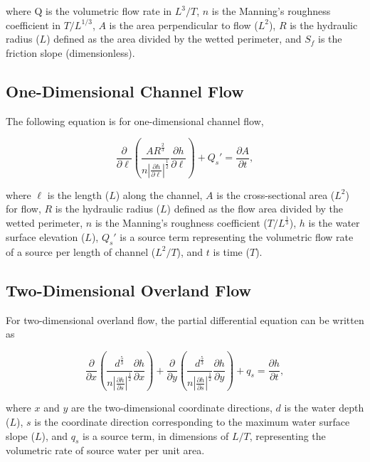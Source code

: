 \documentclass[fleqn]{article}
\begin{document}
\noindent where Q is the volumetric flow rate in $L^3/T$, $n$ is the Manning's roughness coefficient in $T/L^{1/3}$, $A$ is the area perpendicular to flow ($L^2$), $R$ is the hydraulic radius ($L$) defined as the area divided by the wetted perimeter, and $S_f$ is the friction slope (dimensionless).

\subsection{One-Dimensional Channel Flow}

The following equation is for one-dimensional channel flow,

\begin{equation}
  \frac{\partial}{\partial \ell}
  \left (
  \frac{A R^{\frac{2}{3}}}{n \left | \frac{\partial h}{\partial \ell} \right |^{\frac{1}{2}} } \frac{\partial h}{\partial \ell}
  \right )
  + Q_s'
  =   
  \frac{\partial A}{\partial t},
\label{eqn:onedpd}
\end{equation}

\noindent where $\ell$ is the length ($L$) along the channel, $A$ is the cross-sectional area  ($L^2$) for flow, $R$ is the hydraulic radius ($L$) defined as the flow area divided by the wetted perimeter, $n$ is the Manning's roughness coefficient ($T/L^{\frac{1}{3}}$), $h$ is the water surface elevation ($L$), $Q_s'$ is a source term representing the volumetric flow rate of a source per length of channel ($L^2/T$), and $t$ is time ($T$). 

\subsection{Two-Dimensional Overland Flow}

For two-dimensional overland flow, the partial differential equation can be written as

\begin{equation}
  \frac{\partial}{\partial x}
  \left (
  \frac{d^{\frac{5}{3}}}{n \left | \frac{\partial h}{\partial s} \right |^{\frac{1}{2}} } \frac{\partial h}{\partial x}
  \right )
  + \frac{\partial}{\partial y}
  \left (
  \frac{d^{\frac{5}{3}}}{n \left | \frac{\partial h}{\partial s} \right |^{\frac{1}{2}} } \frac{\partial h}{\partial y}
  \right )
  + q_s
  = \frac{\partial h}{\partial t},
  \label{eqn:twodpd}
\end{equation}

\noindent where $x$ and $y$ are the two-dimensional coordinate directions, $d$ is the water depth ($L$), $s$ is the coordinate direction corresponding to the maximum water surface slope ($L$), and $q_s$ is a source term, in dimensions of $L/T$, representing the volumetric rate of source water per unit area.
\end{document}
